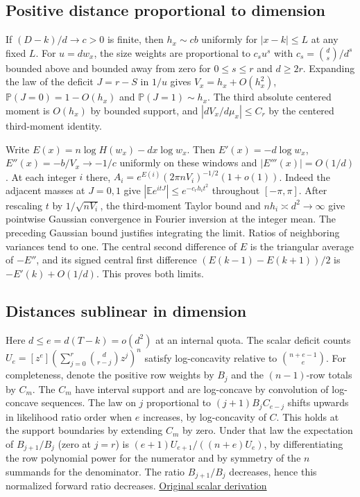 \subsection{Positive distance proportional to dimension}

If $(D-k)/d\to c>0$ is finite, then $h_x\sim cb$ uniformly for $|x-k|\le L$ at any fixed $L$. For $u=dw_x$, the size weights are proportional to $c_s u^s$ with $c_s=\binom ds/d^s$ bounded above and bounded away from zero for $0\le s\le r$ and $d\ge2r$. Expanding the law of the deficit $J=r-S$ in $1/u$ gives $V_x=h_x+O(h_x^2)$, $\mathbb P(J=0)=1-O(h_x)$ and $\mathbb P(J=1)\sim h_x$. The third absolute centered moment is $O(h_x)$ by bounded support, and $|dV_x/d\mu_x|\le C_r$ by the centered third-moment identity.

Write $E(x)=n\log H(w_x)-dx\log w_x$. Then $E'(x)=-d\log w_x$, $E''(x)=-b/V_x\to-1/c$ uniformly on these windows and $|E'''(x)|=O(1/d)$. At each integer $i$ there, $A_i=e^{E(i)}(2\pi nV_i)^{-1/2}(1+o(1))$. Indeed the adjacent masses at $J=0,1$ give $|\mathbb E e^{itJ}|\le e^{-c_r h_i t^2}$ throughout $[-\pi,\pi]$. After rescaling $t$ by $1/\sqrt{nV_i}$, the third-moment Taylor bound and $nh_i\asymp d^2\to\infty$ give pointwise Gaussian convergence in Fourier inversion at the integer mean. The preceding Gaussian bound justifies integrating the limit. Ratios of neighboring variances tend to one. The central second difference of $E$ is the triangular average of $-E''$, and its signed central first difference $(E(k-1)-E(k+1))/2$ is $-E'(k)+O(1/d)$. This proves both limits.

\subsection{Distances sublinear in dimension}

Here $d\le e=d(T-k)=o(d^2)$ at an internal quota. The scalar deficit counts $U_e=[z^e](\sum_{j=0}^r\binom d{r-j}z^j)^n$ satisfy log-concavity relative to $\binom{n+e-1}e$. For completeness, denote the positive row weights by $B_j$ and the $(n-1)$-row totals by $C_m$. The $C_m$ have interval support and are log-concave by convolution of log-concave sequences. The law on $j$ proportional to $(j+1)B_j C_{e-j}$ shifts upwards in likelihood ratio order when $e$ increases, by log-concavity of $C$. This holds at the support boundaries by extending $C_m$ by zero. Under that law the expectation of $B_{j+1}/B_j$ (zero at $j=r$) is $(e+1)U_{e+1}/((n+e)U_e)$, by differentiating the row polynomial power for the numerator and by symmetry of the $n$ summands for the denominator. The ratio $B_{j+1}/B_j$ decreases, hence this normalized forward ratio decreases. \href{https://github.com/ProgramComputer/open-math-research/blob/8bf2220688ce5fb1e4ac745daa655bb3c3813fbf/topics/balanced-arrays/deficit-curvature/scalar.md}{Original scalar derivation}

